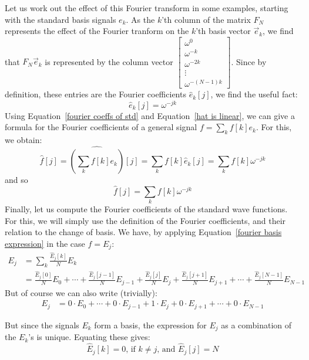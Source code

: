 \documentclass[12pt]{report}
\theoremstyle{plain}
\begin{document}
\medskip
{}
Let us work out the effect of this Fourier transform in some examples, starting with the standard basis signals $e_k$.
As the $k$'th column of the matrix $F_N$ represents the effect of the Fourier tranform on the $k$'th basis vector $\vec e_k$, we find that $F_N \vec e_k$ is represented by the column vector $\begin{bmatrix} \omega^{0} \\ \omega^{-k} \\ \omega^{-2k} \\ \vdots \\ \omega^{-(N-1)k} \end{bmatrix}$. Since by definition, these entries are the Fourier coefficients $\hat e_k[j]$, we find the useful fact:
\begin{equation} \label{fourier coeffs of std}
\boxed{\hat e_k[j] = \omega^{-jk}}
\end{equation}
Using Equation~\ref{fourier coeffs of std} and Equation~\ref{hat is linear}, we can give a formula for the Fourier coefficients of a general signal $f = \sum_k f[k] e_k$. For this, we obtain:
\begin{equation*}
\hat f[j] = \widehat{\left(\sum_k f[k] e_k\right)}[j] = \sum_k f[k] \hat e_k[j] = \sum_k f[k] \omega^{-jk}
\end{equation*}
and so
\begin{equation} \label{fourier coeffs formula}
\boxed{\hat f[j] = \sum_k f[k] \omega^{-jk}}
\end{equation}
Finally, let us compute the Fourier coefficients of the standard wave functions. For this, we will simply use the definition of the Fourier coefficients, and their relation to the change of basis. We have, by applying Equation~\ref{fourier basis expression} in the case $f = E_j$:
\begin{align*}
E_j &= \sum_k \frac{\hat E_j[k]}{N} E_k \\
&= \frac{\hat E_j[0]}{N} E_0 + \cdots +
\frac{\hat E_j[j-1]}{N} E_{j-1} + \frac{\hat E_j[j]}{N} E_{j} + \frac{\hat E_j[j+1]}{N} E_{j+1} + \cdots + \frac{\hat E_j[N-1]}{N} E_{N-1}
\end{align*}
But of course we can also write (trivially):
\begin{align*}
E_j &= 0 \cdot E_0 + \cdots +
0 \cdot E_{j-1} + 1 \cdot E_{j} + 0 \cdot E_{j+1} + \cdots + 0 \cdot E_{N-1}
\end{align*}

But since the signals $E_k$ form a basis, the expression for $E_j$ as a combination of the $E_k$'s is unique. Equating these gives:
\begin{equation} \label{fourier coeffs of waveforms}
\boxed{\hat E_j[k] = 0 \text{, if $k \neq j$, and } \hat E_j[j] = N}
\end{equation}
\end{document}
